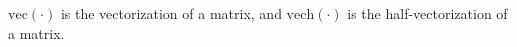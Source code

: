 \noindent
$\mathrm{vec} \left( \cdot \right)$
is the vectorization of a matrix,
and
$\mathrm{vech}  \left( \cdot \right)$
is the half-vectorization of a matrix.
